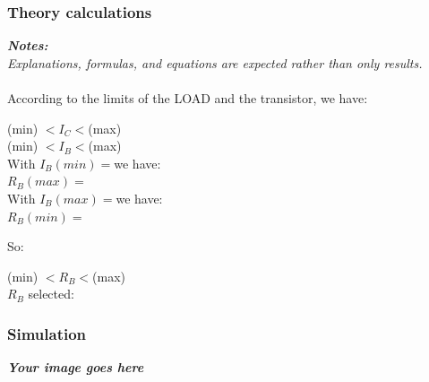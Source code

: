 \subsubsection{Theory calculations}
\textit{\textbf{Notes:}}\\
\textit{Explanations, formulas, and equations are expected rather than only results.}\\
\\
According to the limits of the LOAD and the transistor, we have:\bigskip\\
\begin{center}
    \dotfill (min) $< I_C <$\dotfill(max)\bigskip\\
    \dotfill (min) $< I_B <$\dotfill(max)\bigskip\\
    With $I_B(min) = $\dotfill we have:\bigskip\\
    $R_B(max) = $\dotfill\bigskip\\
    With $I_B(max) = $\dotfill we have:\bigskip\\
    $R_B(min) = $\dotfill\bigskip\\
\end{center}

So:\bigskip

\begin{center}
    \dotfill (min) $< R_B <$\dotfill(max)\bigskip\\
    $R_B$ selected:\dotfill\bigskip\\
\end{center}


\subsubsection{Simulation}
\textbf{\textit{Your image goes here}}
\vspace{8cm}

